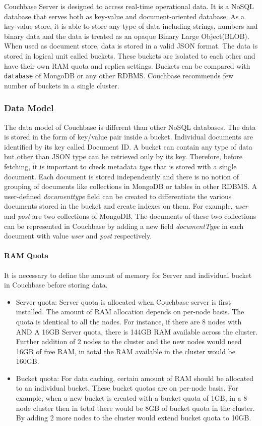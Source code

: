  Couchbase Server is designed to access real-time operational data. It is a NoSQL database that serves both as key-value and document-oriented database. As a key-value store, it is able to store any type of data including  strings, numbers and binary data and the data is treated as an opaque Binary Large Object(BLOB). When used as document store, data is stored in a valid JSON format. The data is stored in logical unit called buckets. These buckets are isolated to each other and have their own RAM quota and replica settings. Buckets can be compared with \texttt{database} of MongoDB or any other RDBMS. Couchbase recommends few number of buckets in a single cluster.
 
 \subsubsection{Data Model}%
 
The data model of Couchbase is different than other NoSQL databases. The data is stored in the form of key/value pair inside a bucket. Individual documents are identified by its key called Document ID. A bucket can contain any type of data but other than JSON type can be retrieved only by its key. Therefore, before fetching, it is important to check metadata \textit{type} that is stored with a single document. Each document is stored independently and there is no notion of grouping of documents like collections in MongoDB or tables in other RDBMS. A user-defined \textit{documenttype} field can be created to differentiate the various documents stored in the bucket and  create indexes on them.  For example, \textit{user} and \textit{post} are two collections of MongoDB. The documents of these two collections can be represented in Couchbase by adding a new field \textit{documentType}  in each document with value \textit{user} and \textit{post} respectively. 

\paragraph{RAM Quota}
It is necessary to define the amount of memory for Server and individual bucket in Couchbase before storing data. 
\begin{itemize}
\item {Server quota:}
          Server quota is allocated when Couchbase server is first installed. The amount of RAM allocation depends on per-node basis. The quota is identical to all the nodes. For instance, if there are 8 nodes with AND A 16GB Server quota, there is 144GB RAM available across the cluster. Further addition of 2 nodes to the cluster and the new nodes would need 16GB of free RAM, in total the RAM available in the cluster would be 160GB.   
\item{Bucket quota:}    
For data caching, certain amount of RAM should be allocated to an individual bucket. These bucket quotas are on per-node basis. For example, when a new bucket is created with a bucket quota of 1GB, in a 8 node cluster then in total there would be 8GB of bucket quota in the cluster. By adding 2 more nodes to the cluster would extend bucket quota to 10GB. 
\end{itemize}
           
